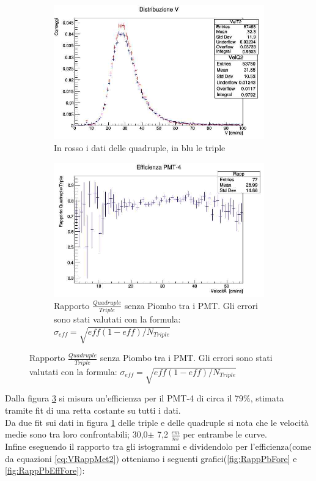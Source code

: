 \documentclass[a4paper]{article}
\begin{document}
\begin{figure}[H]
\centering
\begin{subfigure}[b]{0.4\textwidth}
\includegraphics[width=\textwidth]{./immagini/TimeOfFlight/VNormQuad2.jpg}
\caption{In rosso i dati delle quadruple, in blu le triple}
\label{fig:DistrVPb2Fore}
\end{subfigure}
\hfill
\begin{subfigure}[b]{0.4\textwidth}
\includegraphics[width=\textwidth]{./immagini/TimeOfFlight/EffFore.jpg}
\caption{Rapporto $\frac{Quadruple}{Triple}$ senza Piombo tra i PMT. Gli errori sono stati valutati con la formula: $\sigma _{eff} = \sqrt{eff(1-eff)/N_{Triple}}$}
\label{fig:EffFore}
\end{subfigure}
\end{figure}

Dalla figura \ref{fig:EffFore} si misura un'efficienza per il PMT-4 di circa il 79$\%$, stimata tramite fit di una retta costante su tutti i dati.\\
Da due fit sui dati in figura \ref{fig:DistrVPb2Fore} delle triple e delle quadruple si nota che le velocità medie sono tra loro confrontabili; 30,0$\pm$ 7,2 $\frac{cm}{ns}$ per entrambe le curve.\\
Infine eseguendo il rapporto tra gli istogrammi e dividendolo per l'efficienza(come da equazioni \ref{eq:VRappMet2}) otteniamo i seguenti grafici(\ref{fig:RappPbFore} e \ref{fig:RappPbEffFore}):
\end{document}
